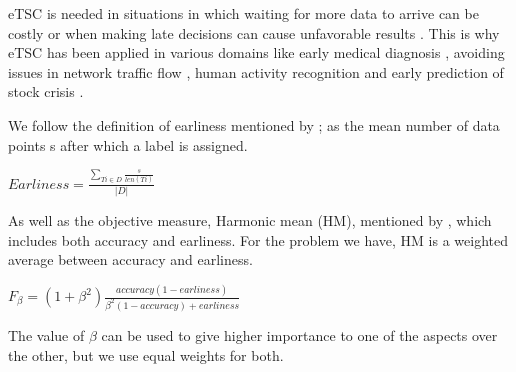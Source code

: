 eTSC is needed in situations in which waiting for more data to arrive can be costly or
when making late decisions can cause unfavorable results \cite{mori2017early,parrish2013classifying,lin2015reliable}.
This is why eTSC has been applied in various domains like early medical diagnosis \cite{griffin2001toward,ghalwash2012early},
avoiding issues in network traffic flow \cite{bernaille2006traffic}, human activity recognition \cite{yazdanbakhsh2019multivariate,gupta2020fault}
and early prediction of stock crisis \cite{ghalwash2014utilizing}.

We follow the definition of earliness mentioned by \cite{schafer2020teaser}; as the mean number of data points s after which a label is assigned.
\begin{definition}
    $Earliness = \frac{\sum_{T{i}\in D} \frac{s}{len(T{i})} }{|D|}$
\end{definition}
As well as the objective measure, Harmonic mean (HM), mentioned by \cite{ghalwash2012early,schafer2020teaser}, which includes both accuracy and earliness.
For the problem we have, HM is a weighted average between accuracy and earliness.
\begin{definition}
    $F_{\beta} = (1 + \beta^2)\frac{accuracy(1-earliness)}{\beta^2(1-accuracy)+earliness}$
\end{definition}
The value of $\beta$ can be used to give higher importance to one of the aspects over the other, but we use equal weights for both.